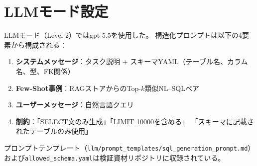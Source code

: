 \documentclass[5p,twocolumn]{elsarticle}
\begin{document}
\section{LLMモード設定}
\label{sec:sup_llm_config}

LLMモード（Level 2）ではgpt-5.5を使用した。
構造化プロンプトは以下の4要素から構成される：

\begin{enumerate}
  \item \textbf{システムメッセージ}：タスク説明 + スキーマYAML（テーブル名、カラム名、型、FK関係）
  \item \textbf{Few-Shot事例}：RAGストアからのTop-$k$類似NL--SQLペア
  \item \textbf{ユーザーメッセージ}：自然言語クエリ
  \item \textbf{制約}：「SELECT文のみ生成」「LIMIT 10000を含める」
        「スキーマに記載されたテーブルのみ使用」
\end{enumerate}

プロンプトテンプレート（\texttt{llm/prompt\_templates/sql\_generation\_prompt.md}）
および\texttt{allowed\_schema.yaml}は検証資材リポジトリに収録されている。
\end{document}
